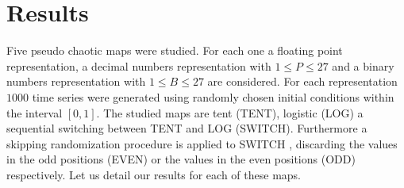 \section{Results}\label{sec:resultados}
Five pseudo chaotic maps were studied. For each one a floating point representation, a decimal numbers representation with $1\leq P \leq 27$ and a binary numbers representation with $1\leq B \leq 27$ are considered. For each representation $1000$ time series were generated using randomly chosen initial conditions within the interval $[0,1]$. 
The studied maps are tent (TENT), logistic (LOG) a sequential switching between TENT and LOG (SWITCH). Furthermore a skipping randomization procedure is applied to SWITCH \cite{DeMicco2008}, discarding the values in the odd positions (EVEN) or the values in the even positions (ODD) respectively. Let us detail our results for each of these maps.



%

